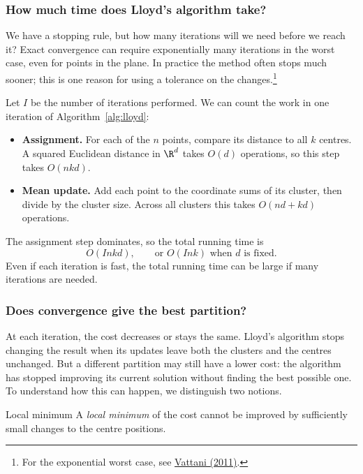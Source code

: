 \documentclass[a4paper,12pt,oneside]{report}
\begin{document}
\subsubsection{How much time does Lloyd's algorithm take?}
\label{sec:lloyd-running-time}

We have a stopping rule, but how many iterations will we need before
we reach it? Exact convergence can require exponentially many
iterations in the worst case, even for points in the plane. In
practice the method often stops much sooner; this is one reason for
using a tolerance on the changes.\footnote{For the exponential
worst case, see \href{https://cseweb.ucsd.edu/~avattani/papers/kmeans-journal.pdf}{Vattani (2011)}.}

Let $I$ be the number of iterations performed. We can count the work
in one iteration of Algorithm~\ref{alg:lloyd}:
\begin{itemize}
  \item \textbf{Assignment.} For each of the $n$ points, compare its
    distance to all $k$ centres. A squared Euclidean distance in
    $\R^d$ takes $O(d)$ operations, so this step takes $O(nkd)$.
  \item \textbf{Mean update.} Add each point to the coordinate sums of
    its cluster, then divide by the cluster size. Across all clusters
    this takes $O(nd+kd)$ operations.
\end{itemize}
The assignment step dominates, so the total running time is
\[
  O(Inkd),\qquad\text{or }O(Ink)\text{ when }d\text{ is fixed}.
\]
Even if each iteration is fast, the total running time can be large
if many iterations are needed.

\subsubsection{Does convergence give the best partition?}
\label{sec:lloyd-local-minima}

At each iteration, the cost decreases or stays the same. Lloyd's
algorithm stops changing the result when its updates leave both the
clusters and the centres unchanged. But a different partition may
still have a lower cost: the algorithm has stopped improving its
current solution without finding the best possible one. To understand
how this can happen, we distinguish two notions.

\begin{frameddefn}{Local minimum}
\label{def:kmeans-local-minimum}
A \emph{local minimum} of the cost cannot be improved by sufficiently
small changes to the centre positions.
\end{frameddefn}
\end{document}

